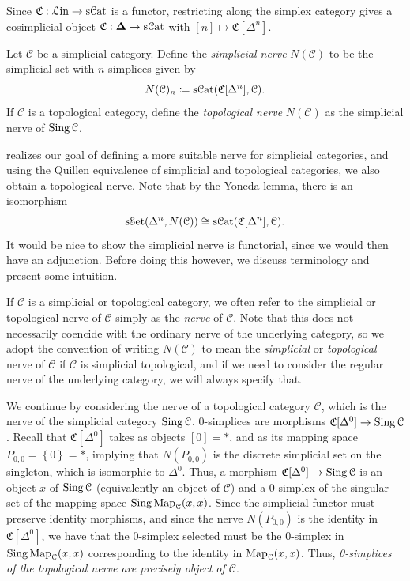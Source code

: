 Since $\mathfrak{C} : \mathcal{L} \mathrm{in}  \to \mathrm{s} \mathcal{C}\mathrm{at} $ is a functor, restricting along the simplex category gives a cosimplicial object $\mathfrak{C} : \boldsymbol{\Delta}  \to \mathrm{s} \mathcal{C}\mathrm{at} $ with $[n]\mapsto \mathfrak{C} [\Delta ^n]$.

\begin{definition}\label{1.1.5.5}
	Let $\mathcal{C} $ be a simplicial category. Define the \emph{simplicial nerve} $N(\mathcal{C} )$ to be the simplicial set with $n$-simplices given by
	\[
		N(\mathcal{C} )_n \coloneqq \mathrm{s} \mathcal{C}\mathrm{at} (\mathfrak{C} [\Delta ^n],\mathcal{C} )
	.\]
	If $\mathcal{C} $ is a topological category, define the \emph{topological nerve} $N(\mathcal{C} )$ as the simplicial nerve of $\operatorname{Sing} \mathcal{C} $.
\end{definition}

 realizes our goal of defining a more suitable nerve for simplicial categories, and using the Quillen equivalence of simplicial and topological categories, we also obtain a topological nerve. Note that by the Yoneda lemma, there is an isomorphism
\[
	\mathrm{s}\mathcal{S}\mathrm{et} (\Delta ^n,N(\mathcal{C} ))\cong \mathrm{s} \mathcal{C}\mathrm{at} (\mathfrak{C} [\Delta ^n],\mathcal{C} )
.\]
It would be nice to show the simplicial nerve is functorial, since we would then have an adjunction. Before doing this however, we discuss terminology and present some intuition.

\begin{terminology}\label{1.1.5.6}
	If $\mathcal{C} $ is a simplicial or topological category, we often refer to the simplicial or topological nerve of $\mathcal{C} $ simply as the \emph{nerve} of $\mathcal{C} $. Note that this does not necessarily coencide with the ordinary nerve of the underlying category, so we adopt the convention of writing $N(\mathcal{C} )$ to mean the \emph{simplicial} or \emph{topological} nerve of $\mathcal{C} $ if $\mathcal{C} $ is simplicial topological, and if we need to consider the regular nerve of the underlying category, we will always specify that.
\end{terminology}

We continue by considering the nerve of a topological category $\mathcal{C} $, which is the nerve of the simplicial category $\operatorname{Sing} \mathcal{C} $. 0-simplices are morphisms $\mathfrak{C} [\Delta ^0]\to \operatorname{Sing} \mathcal{C} $. Recall that $\mathfrak{C} [\Delta ^0]$ takes as objects $[0]=*$, and as its mapping space $P_{0,0} =\left\{ 0 \right\} =*$, implying that $N(P_{0,0} )$ is the discrete simplicial set on the singleton, which is isomorphic to $\Delta ^0$. Thus, a morphism $\mathfrak{C} [\Delta ^0]\to \operatorname{Sing} \mathcal{C} $ is an object $x$ of $\operatorname{Sing} \mathcal{C} $ (equivalently an object of $\mathcal{C} $) and a 0-simplex of the singular set of the mapping space $\operatorname{Sing}\operatorname{Map}_\mathcal{C} (x,x)$. Since the simplicial functor must preserve identity morphisms, and since the nerve $N(P_{0,0} )$ is the identity in $\mathfrak{C} [\Delta ^0]$, we have that the 0-simplex selected must be the 0-simplex in $\operatorname{Sing}\operatorname{Map}_\mathcal{C} (x,x)$ corresponding to the identity in $\operatorname{Map}_\mathcal{C} (x,x)$. Thus, \emph{0-simplices of the topological nerve are precisely object of $\mathcal{C} $}.


